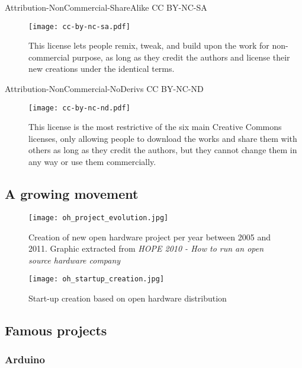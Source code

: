 \begin{description}
    \item[Attribution-NonCommercial-ShareAlike CC BY-NC-SA] \begin{center} \texttt{[image: cc-by-nc-sa.pdf]} \end{center} This license lets people remix, tweak, and build upon the work for non-commercial purpose, as long as they credit the authors and license their new creations under the identical terms.
    \item[Attribution-NonCommercial-NoDerivs CC BY-NC-ND] \begin{center} \texttt{[image: cc-by-nc-nd.pdf]} \end{center} This license is the most restrictive of the six main Creative Commons licenses, only allowing people to download the works and share them with others as long as they credit the authors, but they cannot change them in any way or use them commercially.
\end{description}


\subsection{A growing movement} %



\begin{figure}[H!]
    \begin{center}
        \texttt{[image: oh\_project\_evolution.jpg]}
    \end{center}
    \caption{Creation of new open hardware project per year between 2005 and 2011. Graphic extracted from \emph{HOPE 2010 - How to run an open source hardware company}}
    \label{fig:oh_project_evolution}
\end{figure}


\begin{figure}[]
    \begin{center}
        \texttt{[image: oh\_startup\_creation.jpg]}
    \end{center}
    \caption{Start-up creation based on open hardware distribution}
    \label{fig:oh_startup_creation}
\end{figure}

\subsection{Famous projects} %



\subsubsection{Arduino} %

